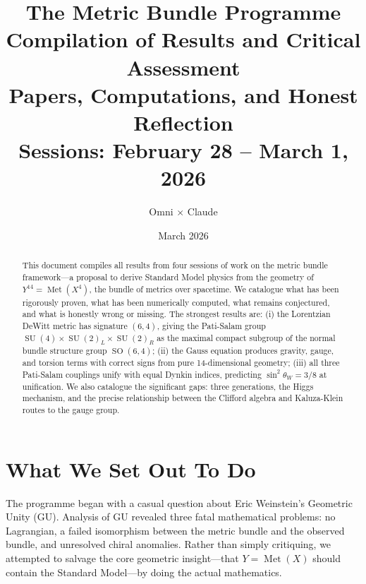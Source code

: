 \documentclass[12pt,a4paper]{article}
\title{\textbf{The Metric Bundle Programme}\\[6pt]
\large Compilation of Results and Critical Assessment\\[6pt]
\normalsize Papers, Computations, and Honest Reflection\\[12pt]
\small Sessions: February 28 -- March 1, 2026}
\author{Omni $\times$ Claude}
\date{March 2026}
\DeclareMathOperator{\SO}{SO}
\DeclareMathOperator{\SU}{SU}
\DeclareMathOperator{\Met}{Met}
\begin{document}
\maketitle

\begin{abstract}
This document compiles all results from four sessions of work on the metric bundle framework---a proposal to derive Standard Model physics from the geometry of $Y^{14} = \Met(X^4)$, the bundle of metrics over spacetime. We catalogue what has been rigorously proven, what has been numerically computed, what remains conjectured, and what is honestly wrong or missing. The strongest results are: (i) the Lorentzian DeWitt metric has signature $(6,4)$, giving the Pati-Salam group $\SU(4)\times\SU(2)_L\times\SU(2)_R$ as the maximal compact subgroup of the normal bundle structure group $\SO(6,4)$; (ii) the Gauss equation produces gravity, gauge, and torsion terms with correct signs from pure 14-dimensional geometry; (iii) all three Pati-Salam couplings unify with equal Dynkin indices, predicting $\sin^2\theta_W = 3/8$ at unification. We also catalogue the significant gaps: three generations, the Higgs mechanism, and the precise relationship between the Clifford algebra and Kaluza-Klein routes to the gauge group.
\end{abstract}

\tableofcontents
\newpage

\section{What We Set Out To Do}

The programme began with a casual question about Eric Weinstein's Geometric Unity (GU). Analysis of GU revealed three fatal mathematical problems: no Lagrangian, a failed isomorphism between the metric bundle and the observed bundle, and unresolved chiral anomalies. Rather than simply critiquing, we attempted to salvage the core geometric insight---that $Y = \Met(X)$ should contain the Standard Model---by doing the actual mathematics.
\end{document}
